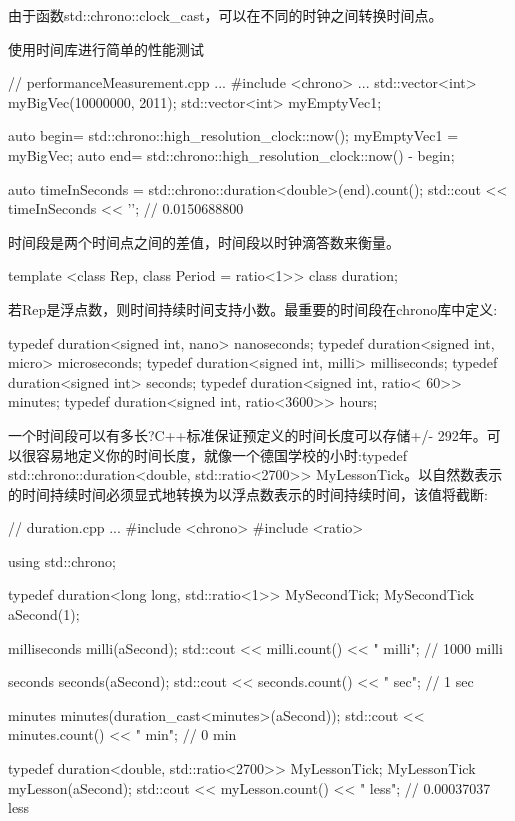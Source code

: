 由于函数std::chrono::clock\_cast，可以在不同的时钟之间转换时间点。

\begin{myTip}{使用时间库进行简单的性能测试}
	

\begin{cpp}
// performanceMeasurement.cpp
...
#include <chrono>
...
std::vector<int> myBigVec(10000000, 2011);
std::vector<int> myEmptyVec1;

auto begin= std::chrono::high_resolution_clock::now();
myEmptyVec1 = myBigVec;
auto end= std::chrono::high_resolution_clock::now() - begin;

auto timeInSeconds = std::chrono::duration<double>(end).count();
std::cout << timeInSeconds << '\n'; // 0.0150688800
\end{cpp}
	
\end{myTip}



时间段是两个时间点之间的差值，时间段以时钟滴答数来衡量。

\begin{cpp}
template <class Rep, class Period = ratio<1>> class duration;
\end{cpp}

若Rep是浮点数，则时间持续时间支持小数。最重要的时间段在chrono库中定义:


\begin{cpp}
typedef duration<signed int, nano> nanoseconds;
typedef duration<signed int, micro> microseconds;
typedef duration<signed int, milli> milliseconds;
typedef duration<signed int> seconds;
typedef duration<signed int, ratio< 60>> minutes;
typedef duration<signed int, ratio<3600>> hours;
\end{cpp}

一个时间段可以有多长?C++标准保证预定义的时间长度可以存储+/- 292年。可以很容易地定义你的时间长度，就像一个德国学校的小时:typedef std::chrono::duration<double, std::ratio<2700>{}> MyLessonTick。以自然数表示的时间持续时间必须显式地转换为以浮点数表示的时间持续时间，该值将截断:


\begin{cpp}
// duration.cpp
...
#include <chrono>
#include <ratio>

using std::chrono;

typedef duration<long long, std::ratio<1>> MySecondTick;
MySecondTick aSecond(1);

milliseconds milli(aSecond);
std::cout << milli.count() << " milli"; // 1000 milli

seconds seconds(aSecond);
std::cout << seconds.count() << " sec"; // 1 sec

minutes minutes(duration_cast<minutes>(aSecond));
std::cout << minutes.count() << " min"; // 0 min

typedef duration<double, std::ratio<2700>> MyLessonTick;
MyLessonTick myLesson(aSecond);
std::cout << myLesson.count() << " less"; // 0.00037037 less
\end{cpp}


